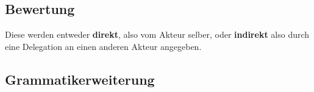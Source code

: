 \documentclass[]{article}
\begin{document}
% 
%     


\subsection{Bewertung}
Diese werden entweder \textbf{direkt}, also vom Akteur selber, oder \textbf{indirekt} also durch eine Delegation an einen anderen Akteur angegeben.
% 
% 
% 
% 
% 
% 

\subsection{Grammatikerweiterung}
\end{document}
